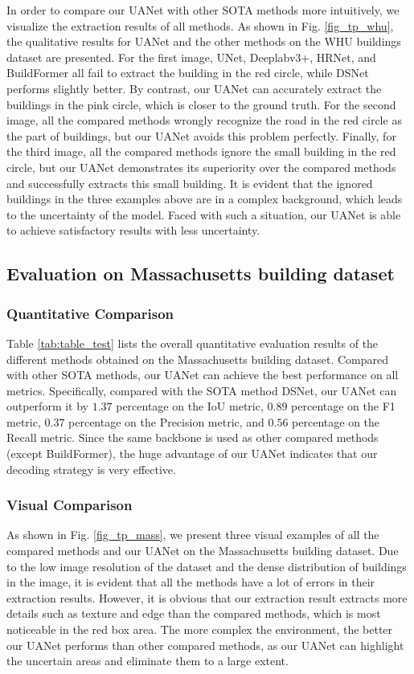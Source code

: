 \documentclass[lettersize,journal]{IEEEtran}
\begin{document}
In order to compare our UANet with other SOTA methods more intuitively, we visualize the extraction results of all methods. As shown in Fig. \ref{fig_tp_whu}, the qualitative results for UANet and the other methods on the WHU buildings dataset are presented. For the first image, UNet, Deeplabv3+, HRNet, and BuildFormer all fail to extract the building in the red circle, while DSNet performs slightly better. By contrast, our UANet can accurately extract the buildings in the pink circle, which is closer to the ground truth. For the second image, all the compared methods wrongly recognize the road in the red circle as the part of buildings, but our UANet avoids this problem perfectly. Finally, for the third image, all the compared methods ignore the small building in the red circle, but our UANet demonstrates its superiority over the compared methods and successfully extracts this small building. It is evident that the ignored buildings in the three examples above are in a complex background, which leads to the uncertainty of the model. Faced with such a situation, our UANet is able to achieve satisfactory results with less uncertainty.

\subsection{Evaluation on Massachusetts building dataset}
\subsubsection{Quantitative Comparison}
Table \ref{tab:table_test} lists the overall quantitative evaluation results of the different methods obtained on the Massachusetts building dataset. Compared with other SOTA methods, our UANet can achieve the best performance on all metrics. Specifically, compared with the SOTA method DSNet, our UANet can outperform it by $1.37$ percentage on the IoU metric, $0.89$ percentage on the F1 metric, $0.37$ percentage on the Precision metric, and $0.56$ percentage on the Recall metric. Since the same backbone is used as other compared methods (except BuildFormer), the huge advantage of our UANet indicates that our decoding strategy is very effective.

\subsubsection{Visual Comparison}
As shown in Fig. \ref{fig_tp_mass}, we present three visual examples of all the compared methods and our UANet on the Massachusetts building dataset. Due to the low image resolution of the dataset and the dense distribution of buildings in the image, it is evident that all the methods have a lot of errors in their extraction results. However, it is obvious that our extraction result extracts more details such as texture and edge than the compared methods, which is most noticeable in the red box area. The more complex the environment, the better our UANet performs than other compared methods, as our UANet can highlight the uncertain areas and eliminate them to a large extent.
\end{document}
